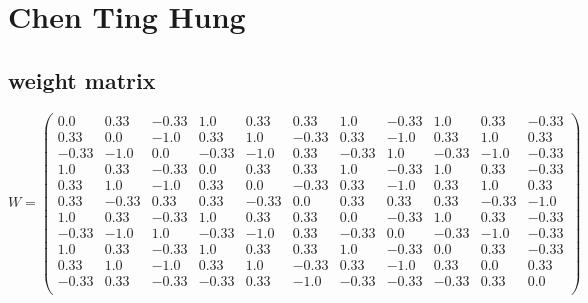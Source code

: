\documentclass[a4paper,fontsize=12pt]{scrartcl}
\begin{document}
\section*{Chen Ting Hung}
\subsection*{weight matrix}
$$ W=\left(\begin{array}{ccccccccccc}
0.0&0.33&-0.33&1.0&0.33&0.33&1.0&-0.33&1.0&0.33&-0.33\\0.33&0.0&-1.0&0.33&1.0&-0.33&0.33&-1.0&0.33&1.0&0.33\\-0.33&-1.0&0.0&-0.33&-1.0&0.33&-0.33&1.0&-0.33&-1.0&-0.33\\1.0&0.33&-0.33&0.0&0.33&0.33&1.0&-0.33&1.0&0.33&-0.33\\0.33&1.0&-1.0&0.33&0.0&-0.33&0.33&-1.0&0.33&1.0&0.33\\0.33&-0.33&0.33&0.33&-0.33&0.0&0.33&0.33&0.33&-0.33&-1.0\\1.0&0.33&-0.33&1.0&0.33&0.33&0.0&-0.33&1.0&0.33&-0.33\\-0.33&-1.0&1.0&-0.33&-1.0&0.33&-0.33&0.0&-0.33&-1.0&-0.33\\1.0&0.33&-0.33&1.0&0.33&0.33&1.0&-0.33&0.0&0.33&-0.33\\0.33&1.0&-1.0&0.33&1.0&-0.33&0.33&-1.0&0.33&0.0&0.33\\-0.33&0.33&-0.33&-0.33&0.33&-1.0&-0.33&-0.33&-0.33&0.33&0.0\\\end{array}\right)$$
\end{document}

